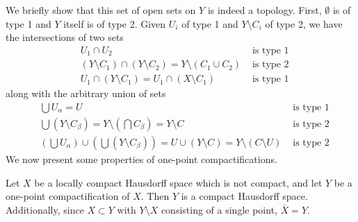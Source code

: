   We briefly show that this set of open sets on $Y$ is indeed a topology. First, $\emptyset$ is of type 1 and $Y$ itself is of type 2. Given $U_i$ of type 1 and $Y \setminus C_i$ of type 2, we have the intersections of two sets
  \begin{align*}
    &U_1 \cap U_2 & \text{ is type 1} \\
    &(Y \setminus C_1) \cap (Y \setminus C_2) = Y \setminus (C_1 \cup C_2) & \text{ is type 2} \\
    &U_1 \cap (Y \setminus C_1) = U_1 \cap (X \setminus C_1) & \text{ is type 1} 
  \end{align*}
  along with the arbitrary union of sets
  \begin{align*}
    &\bigcup U_\alpha = U & \text{ is type 1} \\
    &\bigcup (Y \setminus C_\beta) = Y \setminus (\bigcap C_\beta) = Y \setminus C & \text{ is type 2} \\
    &(\bigcup U_\alpha) \cup ( \bigcup (Y \setminus C_\beta)) = U \cup (Y \setminus C) = Y \setminus (C \setminus U) & \text{ is type 2}
  \end{align*}
  We now present some properties of one-point compactifications. 

  \begin{theorem}
    Let $X$ be a locally compact Hausdorff space which is not compact, and let $Y$ be a one-point compactification of $X$. Then $Y$ is a compact Hausdorff space. Additionally, since $X \subset Y$ with $Y \setminus X$ consisting of a single point, $\bar{X} = Y$. 
  \end{theorem}

